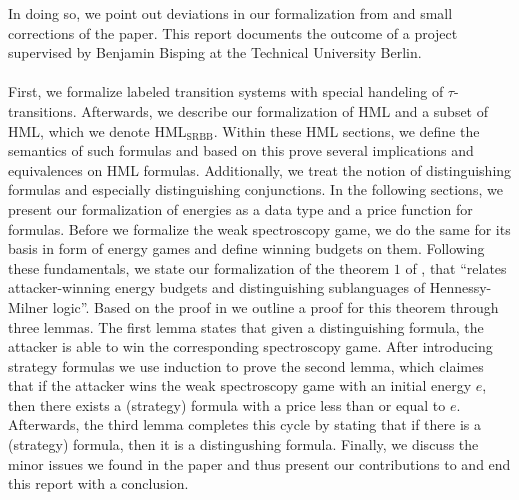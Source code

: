 In doing so, we point out deviations in our formalization from and small corrections of the paper. This report documents the outcome of a project supervised by Benjamin Bisping at the Technical University Berlin. 
\\\\
First, we formalize labeled transition systems with special handeling of $\tau$-transitions.
Afterwards, we describe our formalization of HML and a subset of HML, which we denote HML$_\text{SRBB}$.
Within these HML sections, we define the semantics of such formulas and based on this prove several implications and equivalences on HML formulas.
Additionally, we treat the notion of distinguishing formulas and especially distinguishing conjunctions.
In the following sections, we present our formalization of energies as a data type and a price function for formulas.
Before we formalize the weak spectroscopy game, we do the same for its basis in form of energy games and define winning budgets on them.
Following these fundamentals, we state our formalization of the theorem $1$ of \cite{bisping2023lineartimebranchingtime}, that ``relates attacker-winning energy budgets and distinguishing sublanguages of Hennessy-Milner logic''. 
Based on the proof in \cite{bisping2023lineartimebranchingtime} we outline a proof for this theorem through three lemmas. 
The first lemma states that given a distinguishing formula, the attacker is able to win the corresponding spectroscopy game.
After introducing strategy formulas we use induction to prove the second lemma, which claimes that if the attacker wins the weak spectroscopy game with an initial energy $e$, then there exists a (strategy) formula with a price less than or equal to $e$.
Afterwards, the third lemma completes this cycle by stating that if there is a (strategy) formula, then it is a distingushing formula.
Finally, we discuss the minor issues we found in the paper and thus present our contributions to \cite{bisping2023lineartimebranchingtime} and end this report with a conclusion.